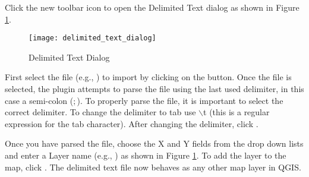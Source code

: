 Click the new toolbar icon  to open the Delimited Text dialog as shown in Figure \ref{fig:delim_text_plugin_dialog}.

\begin{figure}[ht]
   \begin{center}
   \caption{Delimited Text Dialog \nixcaption}\label{fig:delim_text_plugin_dialog}\smallskip
   \texttt{[image: delimited\_text\_dialog]}
   \end{center}  
\end{figure}

First select the file (e.g., ) to import by clicking 
on the  button. Once the file is selected, the plugin attempts to parse the file 
using the last used delimiter, in this case a semi-colon (\mbox{$;$}). To properly parse the file, it 
is important to select the correct delimiter. To change the delimiter to tab use 
\mbox{$\backslash$}t (this is a regular expression for the tab character).
After changing the delimiter, click .

Once you have parsed the file, choose the X and Y fields from the drop down lists and 
enter a Layer name (e.g.,  ) as shown in Figure 
\ref{fig:delim_text_plugin_dialog}. To add the layer to the map, click 
. The delimited text file now behaves as any other map layer in QGIS.
